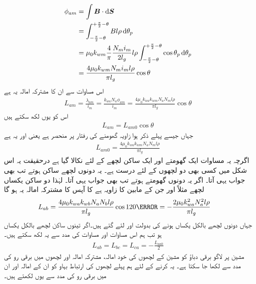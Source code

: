 \begin{gather}
\begin{aligned}
\phi_{am}&=\int \kvec{B} \cdot \dif \kvec{S}\\
&=\int_{-\frac{\pi}{2}-\theta}^{+\frac{\pi}{2}-\theta} B l \rho \dif \theta_p\\
&=\mu_0 k_{wm} \frac{4}{\pi}\frac{N_m i_m}{2 l_g} l \rho \int_{-\frac{\pi}{2}-\theta}^{+\frac{\pi}{2}-\theta} \cos \theta_p \dif \theta_p\\
&=\frac{4 \mu_0 k_{wm}  N_m i_m l \rho}{\pi l_g} \cos \theta
\end{aligned}
\end{gather}
اس مساوات سے ان کا مشترکہ امالہ  یہ ہے 
\begin{align}
L_{am}=\frac{\lambda_{am}}{i_m}=\frac{k_{wa} N_a \phi_{am}}{i_m}=\frac{4 \mu_0 k_{wa} k_{wm} N_a N_m l \rho}{\pi l_g} \cos \theta
\end{align}
اس کو یوں لکھ سکتے ہیں
\begin{align}\label{مساوات_معاصر_ساکن_گھومتا_مشترکہ_امالہ}
L_{am}=L_{am0} \cos \theta
\end{align}
جہاں جیسے پہلے ذکر ہوا زاویہ  گھومنے کی رفتار پر منحصر ہے یعنی   اور   یہ ہے
\begin{align}
L_{am0}=\frac{4 \mu_0 k_{wa} k_{wm} N_a N_m l \rho}{\pi l_g} 
\end{align}
اگرچہ یہ مساوات ایک گھومتے اور ایک ساکن لچھے کے لئے نکالا گیا ہے درحقیقت یہ اس شکل میں کسی بھی دو لچھوں کے لئے درست ہے۔ یہ دونوں لچھے ساکن ہوتے تب بھی جواب یہی آتا۔ اگر یہ دونوں گھومتے ہوتے تب بھی جواب یہی آتا۔ لہٰذا دو ساکن  یکساں لچھے مثلاً  اور  جن کے مابین  کا زاویہ ہے کا آپس کا مشترکہ امالہ یہ ہو گا
\begin{align}
L_{ab}&=\frac{4 \mu_0 k_{wa} k_{wb} N_a N_b l \rho}{\pi l_g} \cos 120\degree=-\frac{2 \mu_0 k_{wa}^2  N_a^2 l \rho}{\pi l_g}
\end{align}
جہاں دونوں لچھے بالکل یکساں ہونے کی بدولت   اور  لئے گئے ہیں۔اگر تینوں ساکن لچھے بالکل یکساں ہو تب ہم اس مساوات اور مساوات  کی مدد سے یہ لکھ سکتے ہیں۔ 
\begin{align}\label{مساوات_معاصر_ساکن_مشترکہ_امالہ}
L_{ab}=L_{bc}=L_{ca}=-\frac{L_{aa0}}{2}
\end{align}
%
مشین پر لاگو برقی دباؤ کو مشین کے لچھوں کی خود امالہ، مشترکہ امالہ اور لچھوں میں برقی رو کی مدد سے لکھا جا سکتا ہے۔ یہ کرنے کے لئے ہم پہلے  لچھوں کی ارتباط بہاو  کو ان کے امالہ اور ان میں برقی رو کی مدد سے یوں لکھتے ہیں۔
